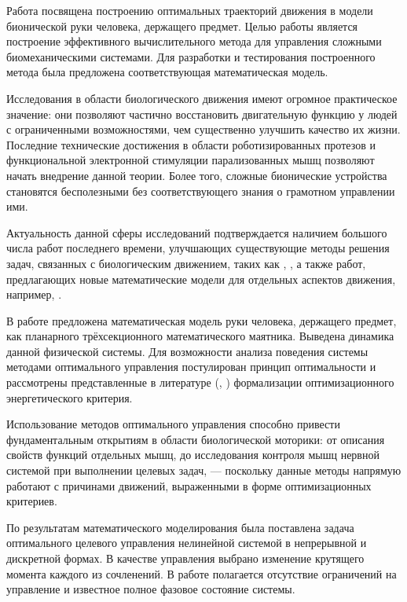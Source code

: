 \documentclass[../doc.tex]{subfiles}
\begin{document}
    Работа посвящена построению оптимальных траекторий движения в модели бионической руки человека,
        держащего предмет.
    Целью работы является построение эффективного вычислительного метода
        для управления сложными биомеханическими системами.
    Для разработки и тестирования построенного метода
        была предложена соответствующая математическая модель.
    
    Исследования в области биологического движения имеют огромное практическое значение:
        они позволяют частично восстановить двигательную фун\-кцию у людей
        с ограниченными возможностями,
        чем существенно улучшить качество их жизни.
    Последние технические достижения в области роботизированных протезов
        и функциональной электронной стимуляции парализованных мышц
        позволяют начать внедрение данной теории.
    Более того, сложные бионические устройства становятся бесполезными без соответствующего знания
        о грамотном управлении ими.
    
    Актуальность данной сферы исследований подтверждается наличием большого числа работ последнего времени,
        улучшающих существующие методы решения задач, связанных с биологическим движением, таких как \cite{maneeshika2023}, \cite{wang2008},
        а также работ,
        предлагающих новые математические модели для отдельных аспектов движения, например, \cite{maroger2022}.

    В работе предложена математическая модель руки человека, держащего предмет,
        как планарного трёхсекционного математического маятника.
    Выведена динамика данной физической системы.
    Для возможности анализа поведения системы методами оптимального управления
        постулирован принцип оптимальности
        и рассмотрены представленные в литературе (\cite{hogan1984}, \cite{uno1989}) формализации
        оптимизационного энергетического критерия.
    
    Использование методов оптимального управления способно привести фундаментальным открытиям в области
        биологической моторики: от описания свойств функций отдельных мышц, до исследования контроля
        мышц нервной системой при выполнении целевых задач, ---
        поскольку данные методы напрямую работают с причинами движений, выраженными в форме оптимизационных критериев.

    По результатам математического моделирования была поставлена задача оптимального целевого управления нелинейной системой в непрерывной и дискретной формах.
    В качестве управления выбрано изменение крутящего момента каждого из сочленений.
    В работе полагается отсутствие ограничений на управление и известное полное фазовое состояние системы.
\end{document}
